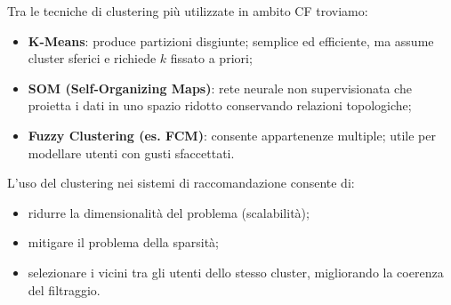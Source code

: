 Tra le tecniche di clustering più utilizzate in ambito CF troviamo:

\begin{itemize}
    \item \textbf{K-Means}: produce partizioni disgiunte; semplice ed efficiente, ma assume cluster sferici e richiede $k$ fissato a priori;
    \item \textbf{SOM (Self-Organizing Maps)}: rete neurale non supervisionata che proietta i dati in uno spazio ridotto conservando relazioni topologiche;
    \item \textbf{Fuzzy Clustering (es. FCM)}: consente appartenenze multiple; utile per modellare utenti con gusti sfaccettati.
\end{itemize}

L’uso del clustering nei sistemi di raccomandazione consente di:
\begin{itemize}
    \item ridurre la dimensionalità del problema (scalabilità);
    \item mitigare il problema della sparsità;
    \item selezionare i vicini tra gli utenti dello stesso cluster, migliorando la coerenza del filtraggio.
\end{itemize}


